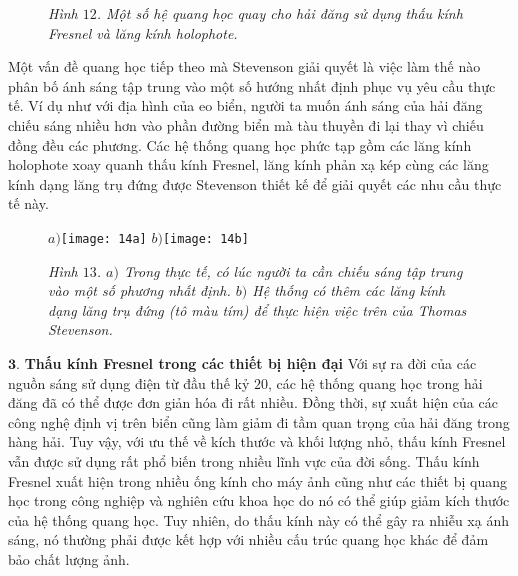 \begin{multicols}{2}
\begin{figure}[H]
		\caption{\small\textit{\color{timhieukhoahoc}Hình $12$. Một số hệ quang học quay cho hải đăng sử dụng thấu kính Fresnel và lăng kính holophote.}}
		\vspace*{-5pt}
	\end{figure}
	Một vấn đề quang học tiếp theo mà Stevenson giải quyết là việc làm thế nào phân bố ánh sáng tập trung vào một số hướng nhất định phục vụ yêu cầu thực tế. Ví dụ như với địa hình của eo biển, người ta muốn ánh sáng của hải đăng chiếu sáng nhiều hơn vào phần đường biển mà tàu thuyền đi lại thay vì chiếu đồng đều các phương. Các hệ thống quang học phức tạp gồm các lăng kính holophote xoay quanh thấu kính Fresnel, lăng kính phản xạ kép cùng các lăng kính dạng lăng trụ đứng được Stevenson thiết kế để giải quyết các nhu cầu thực tế này.
	\begin{figure}[H]
		\vspace*{-5pt}
		\centering
		\captionsetup{labelformat= empty, justification=centering}
		$a)$\texttt{[image: 14a]}
		$b)$\texttt{[image: 14b]}
		\caption{\small\textit{\color{timhieukhoahoc}Hình $13$. $a)$ Trong thực tế, có lúc người ta cần chiếu sáng tập trung vào một số phương nhất định. $b)$ Hệ thống có thêm các lăng kính dạng lăng trụ đứng (tô màu tím) để thực hiện việc trên của Thomas Stevenson.}}
		\vspace*{-10pt}
	\end{figure}
	$\pmb{3.}$ \textbf{\color{timhieukhoahoc}Thấu kính Fresnel trong các thiết bị hiện đại}
	\vskip 0.1cm
	Với sự ra đời của các nguồn sáng sử dụng điện từ đầu thế kỷ $20$, các hệ thống quang học trong hải đăng đã có thể được đơn giản hóa đi rất nhiều. Đồng thời, sự xuất hiện của các công nghệ định vị trên biển cũng làm giảm đi tầm quan trọng của hải đăng trong hàng hải. Tuy vậy, với ưu thế về kích thước và khối lượng nhỏ, thấu kính Fresnel vẫn được sử dụng rất phổ biến trong nhiều lĩnh vực của đời sống. 
	\vskip 0.1cm
	Thấu kính Fresnel xuất hiện trong nhiều ống kính cho máy ảnh cũng như các thiết bị quang học trong công nghiệp và nghiên cứu khoa học do nó có thể giúp giảm kích thước của hệ thống quang học. Tuy nhiên, do thấu kính này có thể gây ra nhiễu xạ ánh sáng, nó thường phải được kết hợp với nhiều cấu trúc quang học khác để đảm bảo chất lượng ảnh.
	\begin{figure}[H]
		\vspace*{-5pt}
		\centering
		\captionsetup{labelformat= empty, justification=centering}

\end{figure}
\end{multicols}

